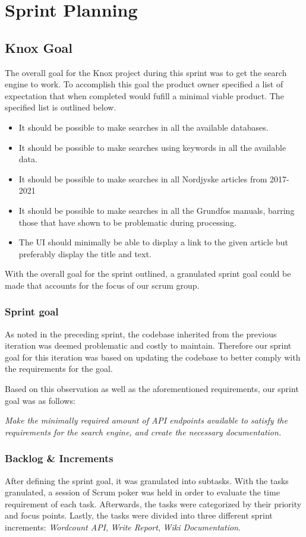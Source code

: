 \section{Sprint Planning}
\subsection{Knox Goal}
The overall goal for the Knox project during this sprint was to get the search engine to work. To accomplish this goal the product owner specified a list of expectation that when completed would fufill a minimal viable product. The specified list is outlined below.
\begin{itemize}
	\item It should be possible to make searches in all the available databases.
	\item It should be possible to make searches using keywords in all the available data.
	\item It should be possible to make searches in all Nordjyske articles from 2017-2021
	\item It should be possible to make searches in all the Grundfos manuals, barring those that have shown to be problematic during processing.
	\item The UI should minimally be able to display a link to the given article but preferably display the title and text.
\end{itemize}

With the overall goal for the sprint outlined, a granulated sprint goal could be made that accounts for the focus of our scrum group.

\subsubsection{Sprint goal}
As noted in the preceding sprint, the codebase inherited from the previous iteration was deemed problematic and costly to maintain. 
Therefore our sprint goal for this iteration was based on updating the codebase to better comply with the requirements for the \knox{} goal.


Based on this observation as well as the aforementioned requirements, our sprint goal was as follows:
\vspace{\baselineskip}

\textit{Make the minimally required amount of API endpoints available to satisfy the requirements for the search engine, and create the necessary documentation.}

\subsubsection{Backlog \& Increments}
After defining the sprint goal, it was granulated into subtasks. 
With the tasks granulated, a session of Scrum poker was held in order to evaluate the time requirement of each task. 
Afterwards, the tasks were categorized by their priority and focus points.
Lastly, the tasks were divided into three different sprint increments: \textit{Wordcount API}, \textit{Write Report}, \textit{Wiki Documentation}. 


